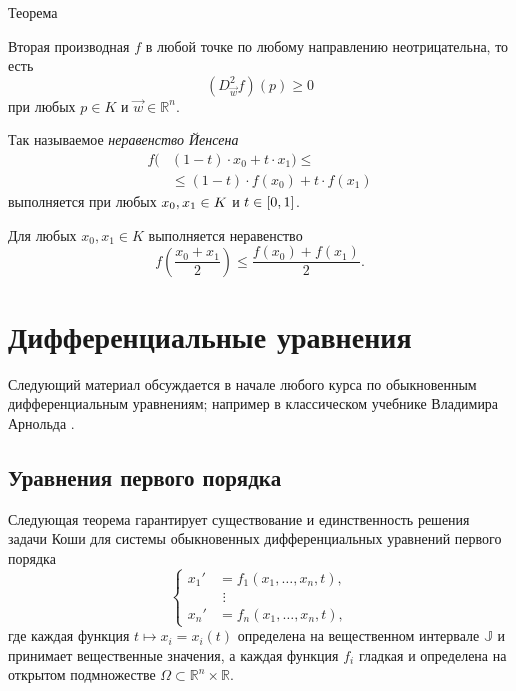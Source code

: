 {\begin{thm}{Теорема}
\begin{subthm}{}
Вторая производная $f$ в любой точке по любому направлению неотрицательна, то есть
\[(D_{\vec w}^2f)(p)\ge 0\]
при любых $p\in K$ и $\vec w\in\mathbb{R}^n$.
\end{subthm}

\begin{subthm}{}
Так называемое \emph{неравенство Йенсена}
\begin{align*}
f (&(1-t)\cdot x_0 + t\cdot x_1 ) \le
\\
&\le (1-t)\cdot f(x_0)+ t\cdot f(x_1)
\end{align*}
выполняется при любых $x_0,x_1\z\in K$ и $t\z\in[0,1]$.

\end{subthm}

\begin{subthm}{}
Для любых $x_0,x_1\in K$ выполняется неравенство
\[f \left (\frac{x_0 + x_1}2 \right ) \le \frac{f(x_0) + f(x_1)}2.\]
\end{subthm}

\end{thm}


\spell{\end{multicols}}{}

\section{Дифференциальные уравнения}

Следующий материал обсуждается в начале любого курса по обыкновенным дифференциальным уравнениям;
например в классическом учебнике Владимира Арнольда \cite{arnold}.


\subsection*{Уравнения первого порядка}

Следующая теорема гарантирует существование и единственность решения задачи Коши для системы обыкновенных дифференциальных уравнений первого порядка
\[
\begin{cases}
x_1'&=f_1(x_1,\dots,x_n,t),
\\
&\,\,\vdots
\\
x_n'&=f_n(x_1,\dots,x_n,t),
\end{cases}
\]
где каждая функция $t\mapsto x_i=x_i(t)$ определена на вещественном интервале $\mathbb{J}$ и принимает вещественные значения, а каждая функция $f_i$ гладкая и определена на открытом подмножестве $\Omega\subset \mathbb{R}^n\times \mathbb{R}$.

}
